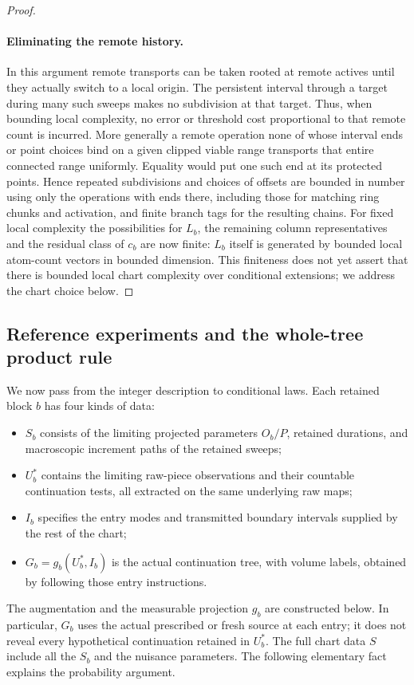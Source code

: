 \begin{proof}
\paragraph{Eliminating the remote history.}

In this argument remote transports can be taken rooted at remote actives until they actually switch to a
local origin. The persistent interval through a target during many such sweeps makes no subdivision at that
target. Thus, when bounding local complexity, no error or threshold cost proportional to that remote count
is incurred. More generally a remote operation none of whose interval ends or point choices bind on a given
clipped viable range transports that entire connected range uniformly. Equality would put one such end at
its protected points. Hence repeated subdivisions and choices of offsets are bounded in number using only
the operations with ends there, including those for matching ring chunks and activation, and finite branch
tags for the resulting chains. For fixed local complexity the possibilities for \(L_b\), the remaining
column representatives and the residual class of \(c_b\) are now finite: \(L_b\) itself is generated by
bounded local atom-count vectors in bounded dimension. This finiteness does not yet assert that there is
bounded local chart complexity over conditional extensions; we address the chart choice below.

\end{proof}

\subsection{Reference experiments and the whole-tree product rule}

We now pass from the integer description to conditional laws. Each retained
block $b$ has four kinds of data:
\begin{itemize}
\item $S_b$ consists of the limiting projected parameters $O_b/P$, retained
  durations, and macroscopic increment paths of the retained sweeps;
\item $U_b^*$ contains the limiting raw-piece observations and their countable
  continuation tests, all extracted on the same underlying raw maps;
\item $I_b$ specifies the entry modes and transmitted boundary intervals supplied
  by the rest of the chart;
\item $G_b=g_b(U_b^*,I_b)$ is the actual continuation tree, with volume labels,
  obtained by following those entry instructions.
\end{itemize}
The augmentation and the measurable projection $g_b$ are constructed below.
In particular, $G_b$ uses the actual prescribed or fresh source at each entry;
it does not reveal every hypothetical continuation retained in $U_b^*$.
The full chart data $S$ include all the $S_b$ and the nuisance parameters.
The following elementary fact explains the probability argument.

